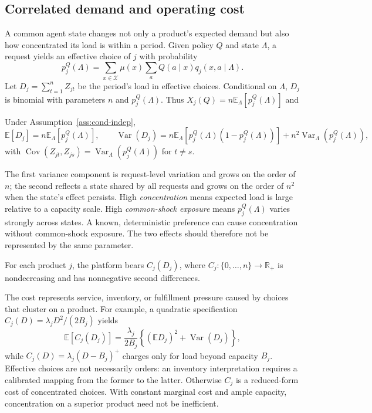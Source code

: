 \documentclass[opre,dblanonrev]{informs4}
\providecommand{\E}{\mathbb{E}}
\providecommand{\1}{\mathbf{1}}
\providecommand{\Var}{\operatorname{Var}}
\providecommand{\Cov}{\operatorname{Cov}}
\begin{document}
\subsection{Correlated demand and operating cost}\label{sec:model-load}

A common agent state changes not only a product's expected demand but also how concentrated its load is within a period. Given policy $Q$ and state $\Lambda$, a request yields an effective choice of $j$ with probability
\begin{equation}\label{eq:pQ}
p_j^Q(\Lambda)=\sum_{x\in\mathcal X}\mu(x)\sum_a Q(a\mid x)q_j(x,a\mid\Lambda).
\end{equation}
Let $D_j=\sum_{t=1}^{n}Z_{jt}$ be the period's load in effective choices. Conditional on $\Lambda$, $D_j$ is binomial with parameters $n$ and $p_j^Q(\Lambda)$. Thus $X_j(Q)=n\E_\Lambda[p_j^Q(\Lambda)]$ and
\begin{lemma}\label{lem:load}
Under Assumption~\ref{ass:cond-indep},
\[
\E[D_j]=n\E_\Lambda[p_j^Q(\Lambda)],\qquad
\Var(D_j)=n\E_\Lambda[p_j^Q(\Lambda)(1-p_j^Q(\Lambda))]
+n^2\Var_\Lambda(p_j^Q(\Lambda)),
\]
with $\Cov(Z_{jt},Z_{js})=\Var_\Lambda(p_j^Q(\Lambda))$ for $t\ne s$.
\end{lemma}

The first variance component is request-level variation and grows on the order of $n$; the second reflects a state shared by all requests and grows on the order of $n^2$ when the state's effect persists. High \emph{concentration} means expected load is large relative to a capacity scale. High \emph{common-shock exposure} means $p_j^Q(\Lambda)$ varies strongly across states. A known, deterministic preference can cause concentration without common-shock exposure. The two effects should therefore not be represented by the same parameter.

\begin{assumption}\label{ass:cost}
For each product $j$, the platform bears $C_j(D_j)$, where $C_j:\{0,\ldots,n\}\to\mathbb R_+$ is nondecreasing and has nonnegative second differences.
\end{assumption}

The cost represents service, inventory, or fulfillment pressure caused by choices that cluster on a product. For example, a quadratic specification $C_j(D)=\lambda_jD^2/(2B_j)$ yields
\begin{equation}\label{eq:quad-cost}
\E[C_j(D_j)]=\frac{\lambda_j}{2B_j}\left\{(\E D_j)^2+\Var(D_j)\right\},
\end{equation}
while $C_j(D)=\lambda_j(D-B_j)^+$ charges only for load beyond capacity $B_j$. Effective choices are not necessarily orders: an inventory interpretation requires a calibrated mapping from the former to the latter. Otherwise $C_j$ is a reduced-form cost of concentrated choices. With constant marginal cost and ample capacity, concentration on a superior product need not be inefficient.
\end{document}
